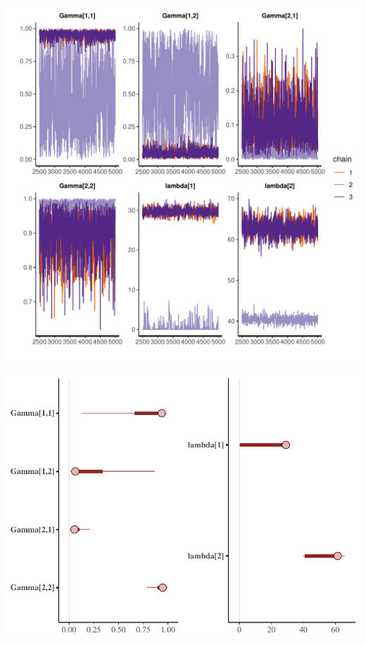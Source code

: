 \documentclass[a4paper]{article}\usepackage[]{graphicx}\usepackage[]{color}
\makeatletter
\def\maxwidth{ %
  \ifdim\Gin@nat@width>\linewidth
    \linewidth
  \else
    \Gin@nat@width
  \fi
}
\newenvironment{knitrout}{}{} %
\makeatother
\begin{document}
\begin{knitrout}
\color{fgcolor}
\includegraphics[width=\maxwidth]{figure/unnamed-chunk-30-1} 

\end{knitrout}


\begin{knitrout}
\color{fgcolor}
\includegraphics[width=\maxwidth]{figure/unnamed-chunk-31-1} 

\end{knitrout}
\end{document}

